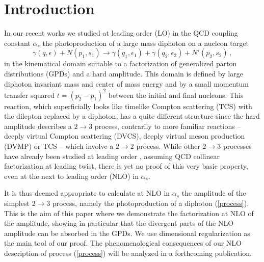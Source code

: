 \documentclass[aps,prd,superscriptaddress,floatfix,showpacs]{revtex4}
\begin{document}
\section{Introduction}
In our recent works \cite{Pedrak:2017cpp, Pedrak:2020mfm} we studied at leading order (LO) in the QCD coupling constant $\alpha_s$ the photoproduction of a large mass diphoton on a    nucleon target
\begin{equation}
\gamma(q,\epsilon) + N(p_1,s_1) \rightarrow \gamma(q_1,\epsilon_1) +  \gamma(q_2,\epsilon_2)+ N'(p_2,s_2)\,,
\label{process}
\end{equation}
 in the kinematical domain suitable to a factorization of generalized parton distributions (GPDs) and a hard amplitude. %
 This domain is defined by large %
diphoton invariant mass and center of mass energy and by a small momentum transfer squared $t =(p_2-p_1)^2$ between the initial and  final nucleons. %
This reaction, which superficially looks like timelike Compton scattering (TCS) \cite{Mueller:1998fv, Berger:2001xd, Pire:2011st,Moutarde:2013qs, CLAS:2021lky} with the dilepton replaced by a diphoton, has a quite different structure since the hard amplitude %
describes a $2 \to 3$ process, contrarily to more familiar reactions %
 -- deeply virtual Compton scattering (DVCS), deeply virtual meson production (DVMP) or TCS -- which involve %
 a $2 \to 2$ process. While other  $2 \to 3$ processes have already been studied at leading order \cite{Ivanov:2002jj,Kumano:2009he,Beiyad:2010cxa,Boussarie:2016qop,Duplancic:2018bum}, assuming QCD collinear factorization at leading twist, there is yet no proof of this very basic property, even at the next to leading  order (NLO) in $\alpha_s$.
  
 It is thus deemed appropriate to calculate at NLO in  $\alpha_s$ the amplitude of the simplest $2 \to 3$ process, namely the photoproduction of a diphoton (\ref{process}). This is the aim of this paper where we  demonstrate the factorization at NLO of the amplitude, showing in particular that the divergent parts of the NLO amplitude can be absorbed in the GPDs. We use dimensional regularization as the main tool of our proof. The phenomenological %
consequences of our NLO description of process (\ref{process}) will be analyzed in a forthcoming publication.
 
\end{document}
